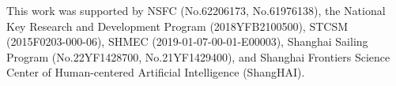 \documentclass[letterpaper]{article} %
\begin{document}
This work was supported by NSFC (No.62206173, No.61976138), the National Key Research and Development Program (2018YFB2100500), STCSM (2015F0203-000-06), SHMEC (2019-01-07-00-01-E00003), Shanghai Sailing Program (No.22YF1428700, No.21YF1429400), and Shanghai Frontiers Science Center of Human-centered Artificial Intelligence (ShangHAI).


\end{document}
